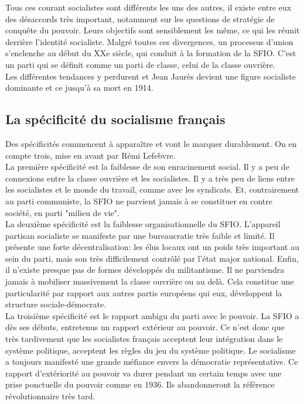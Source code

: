 \documentclass[10pt, a4paper, openany]{book}
\begin{document}
Tous ces courant socialistes sont différents les uns des autres, il existe entre eux des désaccords très important, notamment sur les questions de stratégie de conquête du pouvoir. Leurs objectifs sont sensiblement les même, ce qui les réunit derrière l'identité socialiste. Malgré toutes ces divergences, un processus d'union s'enclenche au début du XXe siècle, qui conduit à la formation de la SFIO. C'est un parti qui se définit comme un parti de classe, celui de la classe ouvrière. \\
Les différentes tendances y perdurent et Jean Jaurès devient une figure socialiste dominante et ce jusqu'à sa mort en 1914. 

\subsection{La spécificité du socialisme français}

Des spécificités commencent à apparaître et vont le marquer durablement. On en compte trois, mise en avant par Rémi Lefebvre. \\
La première spécificité est la faiblesse de son enracinement social. Il y a peu de connexions entre la classe ouvrière et les socialistes. Il y a très peu de liens entre les socialistes et le monde du travail, comme avec les syndicats. Et, contrairement au parti communiste, la SFIO ne parvient jamais à se constituer en contre société, en parti "milieu de vie". \\
La deuxième spécificité est la faiblesse organisationnelle du SFIO. L'appareil partisan socialiste se manifeste par une bureaucratie très faible et limité. Il présente une forte décentralisation: les élus locaux ont un poids très important au sein du parti, mais son très difficilement contrôlé par l'état major national. Enfin, il n'existe presque pas de formes développés du militantisme. Il ne parviendra jamais à mobiliser massivement la classe ouvrière ou au delà. Cela constitue une particularité par rapport aux autres partis européens qui eux, développent la structure sociale-démocrate. \\
La troisième spécificité est le rapport ambigu du parti avec le pouvoir. La SFIO a dès ses débuts, entretenus un rapport extérieur au pouvoir. Ce n'est donc que très tardivement que les socialistes français acceptent leur intégration dans le système politique, acceptent les règles du jeu du système politique. Le socialisme a toujours manifesté une grande méfiance envers la démocratie représentative. Ce rapport d'extériorité au pouvoir va durer pendant un certain temps avec une prise ponctuelle du pouvoir comme en 1936. Ils abandonneront la référence révolutionnaire très tard. 
\end{document}
